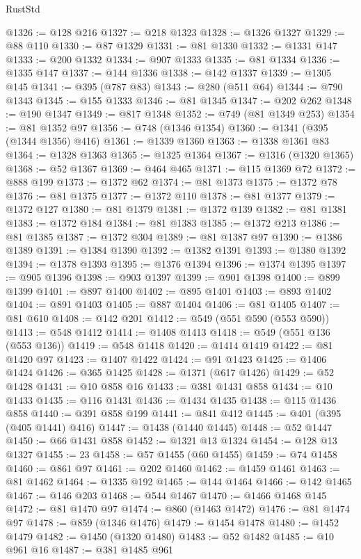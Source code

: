 \begin{lexlean}{RustStd}
\begin{coremodule}
@1326 := @128 @216
@1327 := @218 @1323
@1328 := @1326 @1327
@1329 := @88 @110
@1330 := @87 @1329
@1331 := @81 @1330
@1332 := @1331 @147
@1333 := @200 @1332
@1334 := @907 @1333
@1335 := @81 @1334
@1336 := @1335 @147
@1337 := @144 @1336
@1338 := @142 @1337
@1339 := @1305 @145
@1341 := @395 (@787 @83)
@1343 := @280 (@511 @64)
@1344 := @790 @1343
@1345 := @155 @1333
@1346 := @81 @1345
@1347 := @202 @262
@1348 := @190 @1347
@1349 := @817 @1348
@1352 := @749 (@81 @1349 @253)
@1354 := @81 @1352 @97
@1356 := @748 (@1346 @1354)
@1360 := @1341 (@395 (@1344 @1356) @416)
@1361 := @1339 @1360
@1363 := @1338 @1361 @83
@1364 := @1328 @1363
@1365 := @1325 @1364
@1367 := @1316 (@1320 @1365)
@1368 := @52 @1367
@1369 := @464 @465
@1371 := @115 @1369 @72
@1372 := @888 @199
@1373 := @1372 @62
@1374 := @81 @1373
@1375 := @1372 @78
@1376 := @81 @1375
@1377 := @1372 @110
@1378 := @81 @1377
@1379 := @1372 @127
@1380 := @81 @1379
@1381 := @1372 @139
@1382 := @81 @1381
@1383 := @1372 @184
@1384 := @81 @1383
@1385 := @1372 @213
@1386 := @81 @1385
@1387 := @1372 @304
@1389 := @81 @1387 @97
@1390 := @1386 @1389
@1391 := @1384 @1390
@1392 := @1382 @1391
@1393 := @1380 @1392
@1394 := @1378 @1393
@1395 := @1376 @1394
@1396 := @1374 @1395
@1397 := @905 @1396
@1398 := @903 @1397
@1399 := @901 @1398
@1400 := @899 @1399
@1401 := @897 @1400
@1402 := @895 @1401
@1403 := @893 @1402
@1404 := @891 @1403
@1405 := @887 @1404
@1406 := @81 @1405
@1407 := @81 @610
@1408 := @142 @201
@1412 := @549 (@551 @590 (@553 @590))
@1413 := @548 @1412
@1414 := @1408 @1413
@1418 := @549 (@551 @136 (@553 @136))
@1419 := @548 @1418
@1420 := @1414 @1419
@1422 := @81 @1420 @97
@1423 := @1407 @1422
@1424 := @91 @1423
@1425 := @1406 @1424
@1426 := @365 @1425
@1428 := @1371 (@617 @1426)
@1429 := @52 @1428
@1431 := @10 @858 @16
@1433 := @381 @1431 @858
@1434 := @10 @1433
@1435 := @116 @1431
@1436 := @1434 @1435
@1438 := @115 @1436 @858
@1440 := @391 @858 @199
@1441 := @841 @412
@1445 := @401 (@395 (@405 @1441) @416)
@1447 := @1438 (@1440 @1445)
@1448 := @52 @1447
@1450 := @66 @1431 @858
@1452 := @1321 @13 @1324
@1454 := @128 @13 @1327
@1455 := 23
@1458 := @57 @1455 (@60 @1455)
@1459 := @74 @1458
@1460 := @861 @97
@1461 := @202 @1460
@1462 := @1459 @1461
@1463 := @81 @1462
@1464 := @1335 @192
@1465 := @144 @1464
@1466 := @142 @1465
@1467 := @146 @203
@1468 := @544 @1467
@1470 := @1466 @1468 @145
@1472 := @81 @1470 @97
@1474 := @860 (@1463 @1472)
@1476 := @81 @1474 @97
@1478 := @859 (@1346 @1476)
@1479 := @1454 @1478
@1480 := @1452 @1479
@1482 := @1450 (@1320 @1480)
@1483 := @52 @1482
@1485 := @10 @961 @16
@1487 := @381 @1485 @961

\end{coremodule}
\end{lexlean}
